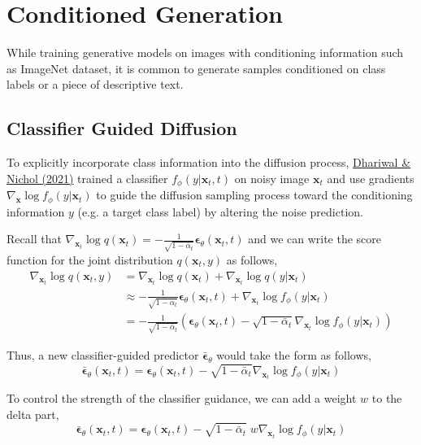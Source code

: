 \documentclass[12pt]{article}
\begin{document}
\section{Conditioned Generation}
While training generative models on images with conditioning information such as ImageNet dataset, it is common to generate samples conditioned on class labels or a piece of descriptive text.

\subsection{Classifier Guided Diffusion}
To explicitly incorporate class information into the diffusion process, \href{https://arxiv.org/abs/2105.05233}{Dhariwal \& Nichol (2021)} trained a classifier $f_\phi(y \vert \mathbf{x}_t, t)$ on noisy image $\mathbf{x}_t$ and use gradients $\nabla_\mathbf{x} \log f_\phi(y \vert \mathbf{x}_t)$ to guide the diffusion sampling process toward the conditioning information $y$ (e.g. a target class label) by altering the noise prediction.

Recall that $\nabla_{\mathbf{x}_t} \log q(\mathbf{x}_t) = - \frac{1}{\sqrt{1 - \bar{\alpha}_t}} \boldsymbol{\epsilon}_\theta(\mathbf{x}_t, t)$ and we can write the score function for the joint distribution $q(\mathbf{x}_t, y)$ as follows,
\[
\begin{aligned}
\nabla_{\mathbf{x}_t} \log q(\mathbf{x}_t, y)
&= \nabla_{\mathbf{x}_t} \log q(\mathbf{x}_t) + \nabla_{\mathbf{x}_t} \log q(y \vert \mathbf{x}_t) \\
&\approx - \frac{1}{\sqrt{1 - \bar{\alpha}_t}} \boldsymbol{\epsilon}_\theta(\mathbf{x}_t, t) + \nabla_{\mathbf{x}_t} \log f_\phi(y \vert \mathbf{x}_t) \\
&= - \frac{1}{\sqrt{1 - \bar{\alpha}_t}} \left(\boldsymbol{\epsilon}_\theta(\mathbf{x}_t, t) - \sqrt{1 - \bar{\alpha}_t} \nabla_{\mathbf{x}_t} \log f_\phi(y \vert \mathbf{x}_t)\right)
\end{aligned}
\]

Thus, a new classifier-guided predictor $\bar{\boldsymbol{\epsilon}}_\theta$ would take the form as follows,
\[
\bar{\boldsymbol{\epsilon}}_\theta(\mathbf{x}_t, t) = \boldsymbol{\epsilon}_\theta(\mathbf{x}_t, t) - \sqrt{1 - \bar{\alpha}_t} \nabla_{\mathbf{x}_t} \log f_\phi(y \vert \mathbf{x}_t)
\]

To control the strength of the classifier guidance, we can add a weight $w$ to the delta part,
\[
\bar{\boldsymbol{\epsilon}}_\theta(\mathbf{x}_t, t) = \boldsymbol{\epsilon}_\theta(\mathbf{x}_t, t) - \sqrt{1 - \bar{\alpha}_t} \; w \nabla_{\mathbf{x}_t} \log f_\phi(y \vert \mathbf{x}_t)
\]
\end{document}
